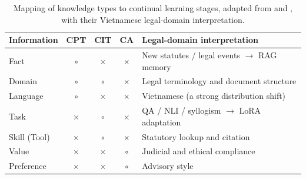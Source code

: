 \begin{table}[H]
\centering
\small
\caption{Mapping of knowledge types to continual learning stages, adapted from \textcite{wu2024continuallearninglargelanguage} and \textcite{shi2024continuallearninglargelanguage}, with their Vietnamese legal-domain interpretation.}
\label{tab:info_stage}
\begin{tabularx}{\textwidth}{l c c c X}
\hline
\textbf{Information} & \textbf{CPT} & \textbf{CIT} & \textbf{CA} & \textbf{Legal-domain interpretation} \\
\hline
Fact          & $\circ$ & $\times$ & $\times$ & New statutes / legal events $\rightarrow$ RAG memory \\
Domain        & $\circ$ & $\circ$  & $\times$ & Legal terminology and document structure \\
Language      & $\circ$ & $\times$ & $\times$ & Vietnamese (a strong distribution shift) \\
Task          & $\times$ & $\circ$ & $\times$ & QA / NLI / syllogism $\rightarrow$ LoRA adaptation \\
Skill (Tool)  & $\times$ & $\circ$ & $\times$ & Statutory lookup and citation \\
Value         & $\times$ & $\times$ & $\circ$ & Judicial and ethical compliance \\
Preference    & $\times$ & $\times$ & $\circ$ & Advisory style \\
\hline
\end{tabularx}
\end{table}


